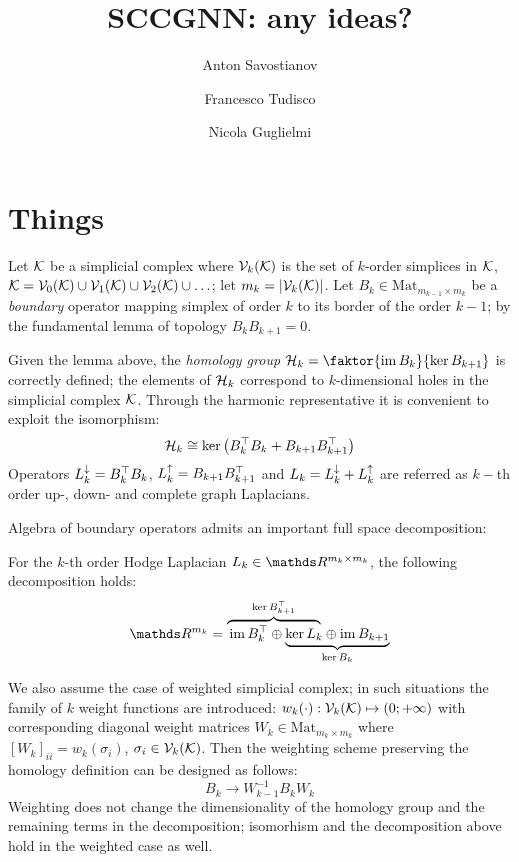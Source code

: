 \documentclass{mynotes}
\title{ SCCGNN: any ideas? }
\author[1]{Anton Savostianov}
\author[1]{Francesco Tudisco}
\author[1]{Nicola Guglielmi}
\affil[1]{Gran Sasso Science Institute, viale F.Crispi 7, L'Aquila, Italy, 67100, email: \email{anton.savostianov@gssi.it} }
\begin{document}
\setlength{\abovedisplayskip}{3pt}
\setlength{\belowdisplayskip}{3pt}

      \maketitle

\section{ Things }

Let \( \mathcal{K} \) be a simplicial complex where \( \mathcal{V}_{k}(\mathcal{K}) \) is the set of \(k\)-order simplices in \( \mathcal{K} \), \( \mathcal{K} = \mathcal{V}_{0}(\mathcal{K}) \cup \mathcal{V}_{1}(\mathcal{K}) \cup \mathcal{V}_{2}(\mathcal{K}) \cup \ldots\); let \( m_k = | \mathcal{V}_{k}(\mathcal{K}) | \). Let \( B_k \in \mathrm{Mat}_{m_{k-1} \times m_k} \) be a \emph{boundary} operator mapping simplex of order \( k \) to its border of the order \( k - 1 \); by the fundamental lemma of topology \( B_k B_{k+1} = 0 \).

Given the lemma above, the \emph{homology group} \( \mc H_k = \faktor{\im B_{k}}{\ker B_{k+1}} \) is correctly defined; the elements of \( \mathcal{H}_k \) correspond to \(k\)-dimensional holes in the simplicial complex \( \mathcal{K} \). Through the harmonic representative it is convenient to exploit the isomorphism:
\begin{equation*}
      \mathcal{H}_k \cong \ker \left( B_k^\top B_k + B_{k+1} B_{k+1}^\top \right)
\end{equation*}
Operators \( L_{k}^{\downarrow} = B_k^\top B_k \), \( L_{k}^{\uparrow} = B_{k+1} B_{k+1}^\top \) and \( L_k = L_{k}^{\downarrow} + L_{k}^{\uparrow} \) are referred as \(k-\)th order up-, down- and complete graph Laplacians.

Algebra of boundary operators admits an important full space decomposition:
\begin{lemma}\label{lem:hodge_decomp}
      For the \(k\)-th order Hodge Laplacian \( L_k \in \ds R^{{m_k} \times {m_k}} \), the following decomposition holds:
      \begin{equation*}
            \ds R^{m_k} = \lefteqn{\overbrace{\phantom{\im B_k^\top \oplus  \ker L_k}}^{\ker B_{k+1}^\top}} \im B_k^\top \oplus
            \underbrace{\ker L_k \oplus  \im B_{k+1}}_{\ker B_k}
      \end{equation*}
\end{lemma}

We also assume the case of weighted simplicial complex; in such situations the family of \( k\) weight functions are introduced: \( w_k(\cdot) : \mathcal{V}_{k}(\mathcal{K}) \mapsto (0; +\infty) \) with corresponding diagonal weight matrices \(W_k \in \mathrm{Mat}_{m_k \times m_k}\) where \( \left[ W_k \right]_{ii} = w_k(\sigma_i) \), \( \sigma_i \in \mathcal{V}_{k}(\mathcal{K}) \). Then the weighting scheme preserving the homology definition can be designed as follows:
\begin{equation*}
      B_k \rightarrow W_{k-1}^{-1} B_k W_k
\end{equation*}
Weighting does not change the dimensionality of the homology group and the remaining terms in the decomposition; isomorhism and the decomposition above hold in the weighted case as well.
\end{document}
